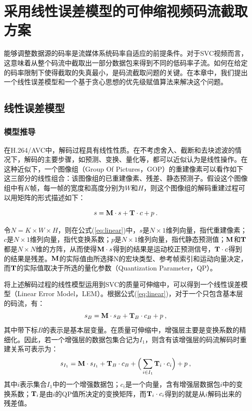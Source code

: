\chapter{采用线性误差模型的可伸缩视频码流截取方案}

能够调整数据源的码率是流媒体系统码率自适应的前提条件。对于SVC视频而言，这意味着从整个码流中截取出一部分数据包来得到不同的低码率子流。如何在给定的码率限制下使得截取的失真最小，是码流截取问题的关键。在本章中，我们提出一个线性误差模型和一个基于贪心思想的优先级赋值算法来解决这个问题。

\section{线性误差模型}

\subsection{模型推导}

在H.264/AVC中，解码过程具有线性性质\supercite{Winken2008}。在不考虑舍入、截断和去块滤波的情况下，解码的主要步骤，如预测、变换、量化等，都可以近似认为是线性操作。在这种近似下，一个图像组（Group Of Pictures，GOP）的重建像素可以看作如下这三部分的线性组合：该图像组的已重建像素、残差、静态预测子。假设这个图像组中有$K$帧，每一帧的宽度和高度分别为$W$和$H$，则这个图像组的解码重建过程可以用矩阵的形式描述如下：

\begin{equation}
\label{eq:linear}
s = {\rm\bf M} \cdot s + {\rm\bf T} \cdot c + p \: .
\end{equation}

令$N = K \times W \times H$，则在公式(\ref{eq:linear})中，$s$是$N \times 1$维列向量，指代重建像素；$c$是$N \times 1$维列向量，指代变换系数；$p$是$N \times 1$维列向量，指代静态预测值；$\rm\bf M$和$\rm\bf T$都是$N \times N$维的方阵，从而使得${\rm\bf M} \cdot s$得到的结果是运动校正预测信号，${\rm\bf T} \cdot c$得到的结果是残差。$\rm\bf M$的实际值由所选择N的宏块类型、参考帧索引和运动向量决定，而$\rm\bf T$的实际值取决于所选的量化参数（Quantization Parameter，QP）。

将上述解码过程的线性模型运用到SVC的质量可伸缩中，可以得到一个线性误差模型（Linear Error Model，LEM）。根据公式(\ref{eq:linear})，对于一个只包含基本层的码流，有：
\begin{equation}
\label{eq:base0}
s_{B} = {\rm\bf M} \cdot s_{B} + {\rm\bf T}_{B} \cdot c_{B} + p \: ,
\end{equation}
其中带下标$B$的表示是基本层变量。在质量可伸缩中，增强层主要是变换系数的精细化。因此，若一个增强层的数据包集合记为$I_1$，则含有该增强层的码流解码时重建关系可表示为：
\begin{equation}
\label{eq:subset1}
s_{I_1} = {\rm\bf M} \cdot s_{I_1} + {\rm\bf T}_{B} \cdot c_{B} + \Big( \sum_{i \in I_1}{\rm\bf T}_i \cdot c_i \Big) + p \: ,
\end{equation}
其中$i$表示集合$I_1$中的一个增强数据包；$c_i$是一个向量，含有增强层数据包$i$中的变换系数；${\rm\bf T}_i$是由$i$的QP值所决定的变换矩阵，而${\rm\bf T}_i \cdot c_i$得到的就是从$i$解码出来的残差值。


